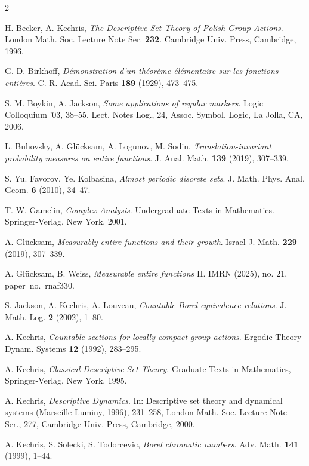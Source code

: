 \documentclass[11pt]{paper}
\begin{document}
\begin{thebibliography}{2}

 H. Becker, A. Kechris, {\em The Descriptive Set Theory of Polish Group
Actions}. London Math. Soc. Lecture Note Ser. {\bf 232}. Cambridge Univ. Press, Cambridge, 1996.

 G. D. Birkhoff,
{\em D\'emonstration d'un th\'eor\`eme \'el\'ementaire sur les fonctions enti\`eres}. C. R.
Acad. Sci. Paris {\bf 189} (1929), 473--475.

 S. M. Boykin, A. Jackson,
{\em Some applications of regular markers}.
Logic Colloquium '03, 38--55, Lect. Notes Log., 24, Assoc. Symbol. Logic, La Jolla, CA, 2006.

 L. Buhovsky, A. Gl\"ucksam, A. Logunov, M. Sodin,
{\em Translation-invariant probability
measures on entire functions}. J. Anal. Math. {\bf 139} (2019), 307--339.

 S. Yu. Favorov, Ye. Kolbasina, {\em Almost periodic discrete sets}.
J. Math. Phys. Anal. Geom. {\bf 6} (2010), 34--47.

 T. W. Gamelin, {\em Complex Analysis}.
Undergraduate Texts in Mathematics. Springer-Verlag, New York, 2001.

 A. Gl\"ucksam,
{\em Measurably entire functions and their growth}. Israel J. Math. {\bf 229} (2019),
307--339.

 A. Gl\"ucksam, B. Weiss,
{\em Measurable entire functions} II.
IMRN (2025), no. 21, paper~no.~rnaf330.


 S. Jackson, A. Kechris, A. Louveau, {\em Countable Borel equivalence relations}.
J. Math. Log. {\bf 2} (2002), 1--80.


 A. Kechris, {\em Countable sections for locally compact group actions}.
Ergodic Theory Dynam. Systems {\bf 12} (1992), 283--295.

 A. Kechris, {\em Classical Descriptive Set Theory}.
Graduate Texts in Mathematics, Springer-Verlag, New York, 1995.

 A. Kechris, {\em Descriptive Dynamics}.
In: Descriptive set theory and dynamical systems (Marseille-Luminy, 1996), 231--258,
London Math. Soc. Lecture Note Ser., 277, Cambridge Univ. Press, Cambridge, 2000.

 A. Kechris, S. Solecki, S. Todorcevic, {\em Borel chromatic numbers}.
Adv. Math. {\bf 141} (1999), 1--44.


\end{thebibliography}
\end{document}

